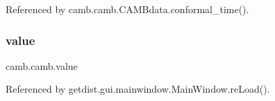 Referenced by camb.\+camb.\+C\+A\+M\+Bdata.\+conformal\+\_\+time().

\mbox{\label{namespacecamb_1_1camb_aec5b3dae7749fd62cdb87c9933d69b06}} 
\subsubsection{\texorpdfstring{value}{value}}
{\footnotesize\ttfamily camb.\+camb.\+value}



Referenced by getdist.\+gui.\+mainwindow.\+Main\+Window.\+re\+Load().

